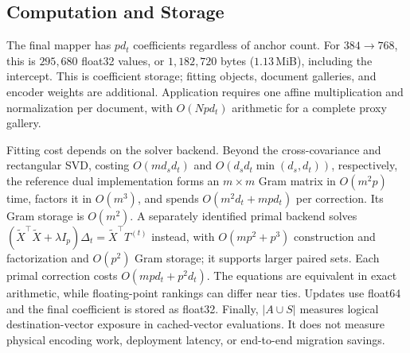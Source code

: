 \subsection{Computation and Storage}
\label{sec:method-cost}

The final mapper has $pd_t$ coefficients regardless of anchor count. For
$384\!\rightarrow\!768$, this is $295{,}680$ float32 values, or $1{,}182{,}720$
bytes ($1.13$\,MiB), including the intercept. This is coefficient storage;
fitting objects, document galleries, and encoder weights are additional.
Application requires one affine multiplication and normalization per document,
with $O(Npd_t)$ arithmetic for a complete proxy gallery.

Fitting cost depends on the solver backend. Beyond the cross-covariance and
rectangular SVD, costing $O(md_sd_t)$ and
$O(d_sd_t\min(d_s,d_t))$, respectively, the reference dual implementation forms an $m\times m$ Gram
matrix in $O(m^2p)$ time, factors it in $O(m^3)$, and spends
$O(m^2d_t+mpd_t)$ per correction. Its Gram storage is $O(m^2)$.
A separately identified primal backend solves
$(\widetilde{X}^{\top}\widetilde{X}+\lambda I_p)\Delta_t=
\widetilde{X}^{\top}T^{(t)}$ instead, with $O(mp^2+p^3)$ construction and
factorization and $O(p^2)$ Gram storage; it supports larger paired sets.
Each primal correction costs $O(mpd_t+p^2d_t)$.
The equations are equivalent in exact arithmetic, while floating-point
rankings can differ near ties. Updates use float64 and the final coefficient
is stored as float32. Finally, $|A\cup S|$ measures logical destination-vector
exposure in cached-vector evaluations. It does not measure physical encoding
work, deployment latency, or end-to-end migration savings.
